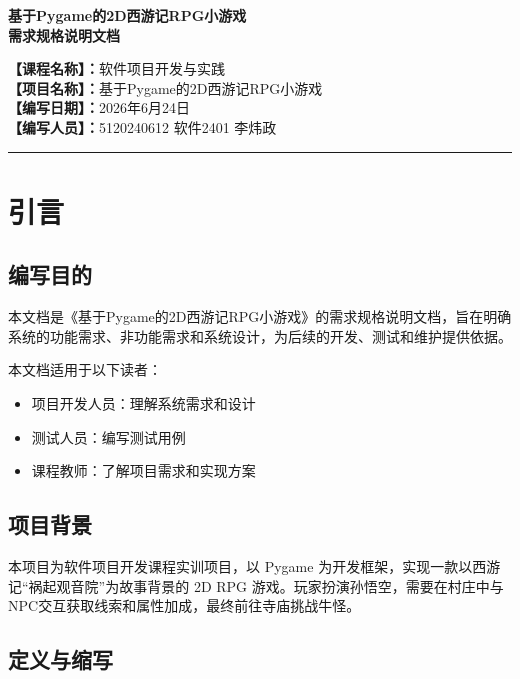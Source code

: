 \documentclass[12pt,a4paper]{article}
\begin{document}
\begin{center}
    {\LARGE\bfseries 基于Pygame的2D西游记RPG小游戏\\[0.3cm]需求规格说明文档}\\[1cm]
\end{center}

\noindent
\textbf{【课程名称】：}软件项目开发与实践\\[6pt]
\textbf{【项目名称】：}基于Pygame的2D西游记RPG小游戏\\[6pt]
\textbf{【编写日期】：}2026年6月24日\\[6pt]
\textbf{【编写人员】：}5120240612 软件2401 李炜政\\[12pt]

\rule{\textwidth}{0.8pt}

\section{引言}

\subsection{编写目的}

本文档是《基于Pygame的2D西游记RPG小游戏》的需求规格说明文档，旨在明确系统的功能需求、非功能需求和系统设计，为后续的开发、测试和维护提供依据。

本文档适用于以下读者：
\begin{itemize}
    \item 项目开发人员：理解系统需求和设计
    \item 测试人员：编写测试用例
    \item 课程教师：了解项目需求和实现方案
\end{itemize}

\subsection{项目背景}

本项目为软件项目开发课程实训项目，以 Pygame 为开发框架，实现一款以西游记“祸起观音院”为故事背景的 2D RPG 游戏。玩家扮演孙悟空，需要在村庄中与NPC交互获取线索和属性加成，最终前往寺庙挑战牛怪。

\subsection{定义与缩写}
\end{document}

